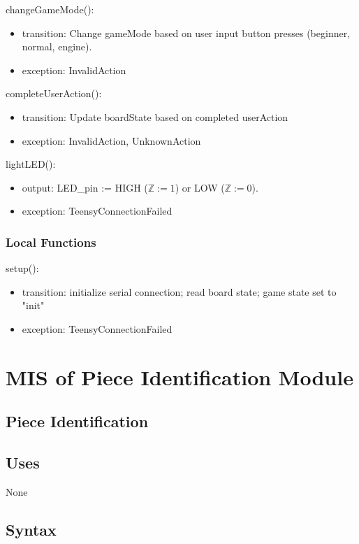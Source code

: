 \documentclass[12pt, titlepage]{article}
\begin{document}
\noindent changeGameMode():
\begin{itemize}
\item transition: Change gameMode based on user input button presses (beginner, normal, engine).
\item exception: InvalidAction
\end{itemize}

\noindent completeUserAction():
\begin{itemize}
\item transition: Update boardState based on completed userAction
\item exception: InvalidAction, UnknownAction
\end{itemize}

\noindent lightLED():
\begin{itemize}
\item output: LED\_pin := HIGH ($\mathbb{Z} := 1$) or LOW  ($\mathbb{Z} := 0$).
\item exception: TeensyConnectionFailed
\end{itemize}

\subsubsection{Local Functions}{
  \noindent setup():
  \begin{itemize}
  \item transition: initialize serial connection; read board state; game state set to "init"
  \item exception: TeensyConnectionFailed
  \end{itemize}
}

\newpage

\section{MIS of Piece Identification Module} \label{PieceIdentificationModule}

\subsection{Piece Identification}

\subsection{Uses}{
  None
}

\subsection{Syntax}
\end{document}
